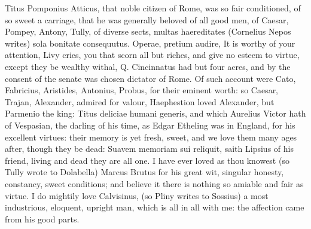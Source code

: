 {Titus Pomponius Atticus, that noble citizen of Rome, was so fair
conditioned, of so sweet a carriage, that he was generally beloved of
all good men, of Caesar, Pompey, Antony, Tully, of diverse sects, \etc{}
multas haereditates (Cornelius Nepos writes) sola bonitate
consequutus. Operae, pretium audire, \etc{} It is worthy of your
attention, Livy cries, you that scorn all but riches, and give no
esteem to virtue, except they be wealthy withal, Q. Cincinnatus had but
four acres, and by the consent of the senate was chosen dictator of
Rome. Of such account were Cato, Fabricius, Aristides, Antonius,
Probus, for their eminent worth: so Caesar, Trajan, Alexander, admired
for valour,  Haephestion loved Alexander, but Parmenio the king:
Titus deliciae humani generis, and which Aurelius Victor hath of
Vespasian, the darling of his time, as Edgar Etheling was in
England, for his excellent virtues: their memory is yet fresh,
sweet, and we love them many ages after, though they be dead: Suavem
memoriam sui reliquit, saith Lipsius of his friend, living and dead
they are all one. I have ever loved as thou knowest (so Tully
wrote to Dolabella) Marcus Brutus for his great wit, singular honesty,
constancy, sweet conditions; and believe it  there is nothing so
amiable and fair as virtue. I do mightily love Calvisinus, (so
Pliny writes to Sossius) a most industrious, eloquent, upright man,
which is all in all with me: the affection came from his good parts.

}
